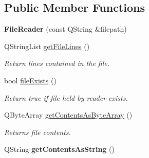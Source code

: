 \subsection*{Public Member Functions}
\begin{DoxyCompactItemize}
\item 
\mbox{\label{classrev_1_1_file_reader_ae7fce228b6d560622174167a5f13bf30}} 
{\bfseries File\+Reader} (const Q\+String \&filepath)
\item 
\mbox{\label{classrev_1_1_file_reader_ae23d0acd899f3520040ffec6f4b48e01}} 
Q\+String\+List \mbox{\hyperlink{classrev_1_1_file_reader_ae23d0acd899f3520040ffec6f4b48e01}{get\+File\+Lines}} ()
\begin{DoxyCompactList}\small\item\em Return lines contained in the file. \end{DoxyCompactList}\item 
\mbox{\label{classrev_1_1_file_reader_a18f9aeb03d2fba43723ebb44d431ca8b}} 
bool \mbox{\hyperlink{classrev_1_1_file_reader_a18f9aeb03d2fba43723ebb44d431ca8b}{file\+Exists}} ()
\begin{DoxyCompactList}\small\item\em Return true if file held by reader exists. \end{DoxyCompactList}\item 
\mbox{\label{classrev_1_1_file_reader_ab3a0c46034839d6b9ef58316d2c33579}} 
Q\+Byte\+Array \mbox{\hyperlink{classrev_1_1_file_reader_ab3a0c46034839d6b9ef58316d2c33579}{get\+Contents\+As\+Byte\+Array}} ()
\begin{DoxyCompactList}\small\item\em Returns file contents. \end{DoxyCompactList}\item 
\mbox{\label{classrev_1_1_file_reader_ac94b19f231190a4606fa3015a6fa17ef}} 
Q\+String {\bfseries get\+Contents\+As\+String} ()
\end{DoxyCompactItemize}
